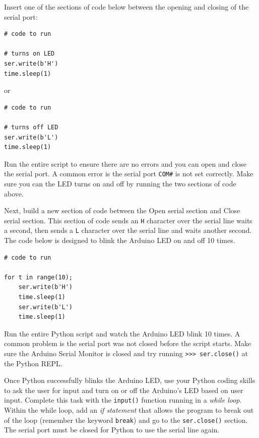 \documentclass[11pt]{article}
\begin{document}
Insert one of the sections of code below between the opening and closing
of the serial port:

\begin{verbatim}
# code to run 

# turns on LED
ser.write(b'H')
time.sleep(1)
\end{verbatim}

or

\begin{verbatim}
# code to run

# turns off LED
ser.write(b'L')
time.sleep(1)
\end{verbatim}

Run the entire script to ensure there are no errors and you can open and
close the serial port. A common error is the serial port
\texttt{\textquotesingle{}COM\#\textquotesingle{}} is not set correctly.
Make sure you can the LED turns on and off by running the two sections
of code above.

Next, build a new section of code between the Open serial section and
Close serial section. This section of code sends an
\texttt{\textquotesingle{}H\textquotesingle{}} character over the serial
line waits a second, then sends a
\texttt{\textquotesingle{}L\textquotesingle{}} character over the serial
line and waits another second. The code below is designed to blink the
Arduino LED on and off 10 times.

\begin{verbatim}
# code to run

for t in range(10);
    ser.write(b'H')
    time.sleep(1)
    ser.write(b'L')
    time.sleep(1)
\end{verbatim}

    Run the entire Python script and watch the Arduino LED blink 10 times. A
common problem is the serial port was not closed before the script
starts. Make sure the Arduino Serial Monitor is closed and try running
\texttt{\textgreater{}\textgreater{}\textgreater{}\ ser.close()} at the
Python REPL.

Once Python successfully blinks the Arduino LED, use your Python coding
skills to ask the user for input and turn on or off the Arduino's LED
based on user input. Complete this task with the \texttt{input()}
function running in a \emph{while loop}. Within the while loop, add an
\emph{if statement} that allows the program to break out of the loop
(remember the keyword \texttt{break}) and go to the \texttt{ser.close()}
section. The serial port must be closed for Python to use the serial
line again.
\end{document}
